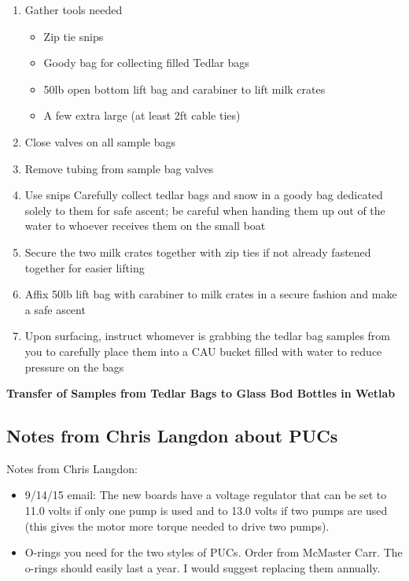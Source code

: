 \documentclass[]{book}
\providecommand{\tightlist}{%
  \setlength{\itemsep}{0pt}\setlength{\parskip}{0pt}}
\begin{document}
\begin{enumerate}
\def\labelenumi{\arabic{enumi}.}
\tightlist
\item
  Gather tools needed

  \begin{itemize}
  \tightlist
  \item
    Zip tie snips
  \item
    Goody bag for collecting filled Tedlar bags
  \item
    50lb open bottom lift bag and carabiner to lift milk crates
  \item
    A few extra large (at least 2ft cable ties)
  \end{itemize}
\item
  Close valves on all sample bags
\item
  Remove tubing from sample bag valves
\item
  Use snips Carefully collect tedlar bags and snow in a goody bag dedicated solely to them for safe ascent; be careful when handing them up out of the water to whoever receives them on the small boat
\item
  Secure the two milk crates together with zip ties if not already fastened together for easier lifting
\item
  Affix 50lb lift bag with carabiner to milk crates in a secure fashion and make a safe ascent
\item
  Upon surfacing, instruct whomever is grabbing the tedlar bag samples from you to carefully place them into a CAU bucket filled with water to reduce pressure on the bags
\end{enumerate}

\textbf{Transfer of Samples from Tedlar Bags to Glass Bod Bottles in Wetlab}

\hypertarget{notes-from-chris-langdon-about-pucs}{%
\subsection{Notes from Chris Langdon about PUCs}\label{notes-from-chris-langdon-about-pucs}}

Notes from Chris Langdon:

\begin{itemize}
\tightlist
\item
  9/14/15 email: The new boards have a voltage regulator that can be set to 11.0 volts if only one pump is used and to 13.0 volts if two pumps are used (this gives the motor more torque needed to drive two pumps).
\item
  O-rings you need for the two styles of PUCs. Order from McMaster Carr. The o-rings should easily last a year. I would suggest replacing them annually.
\end{itemize}
\end{document}
